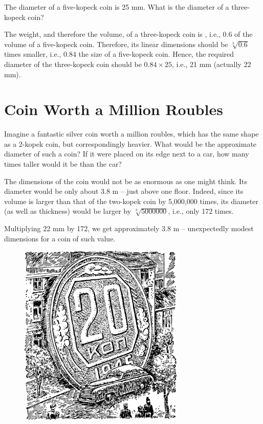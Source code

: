 \ques The diameter of a five-kopeck coin is 25 mm. What is the diameter of a three-kopeck coin?

\ans The weight, and therefore the volume, of a three-kopeck coin is , i.e., 0.6 of the volume of a five-kopeck coin. Therefore, its linear dimensions should be $\sqrt[3]{0.6}$ times smaller, i.e., 0.84 the size of a five-kopeck coin. Hence, the required diameter of the three-kopeck coin should be $0.84 \times 25$, i.e., 21 mm (actually 22 mm).


\section{Coin Worth a Million Roubles}
\label{sec-11.11}


\ques Imagine a fantastic silver coin worth a million roubles, which has the same shape as a 2-kopek coin, but correspondingly heavier. What would be the approximate diameter of such a coin? If it were placed on its edge next to a car, how many times taller would it be than the car?



\ans The dimensions of the coin would not be as enormous as one might think. Its diameter would be only about 3.8 m -- just above one floor. Indeed, since its volume is larger than that of the two-kopek coin by 5,000,000 times, its diameter (as well as thickness) would be larger by $\sqrt[3]{5000000}$, i.e., only 172 times.

Multiplying 22 mm by 172, we get approximately 3.8 m -- unexpectedly modest dimensions for a coin of such value.

\begin{figure}[h!]
\centering
\includegraphics[width=0.7\textwidth]{figures/ch-11/fig-169.pdf}
\end{figure}

